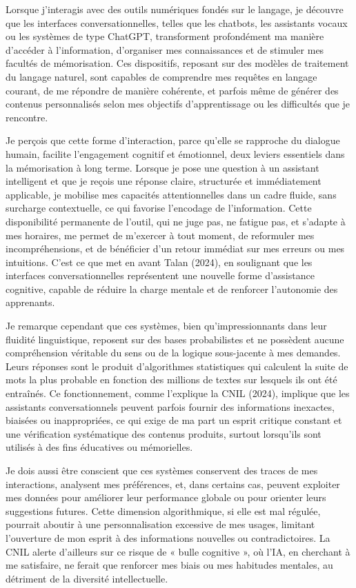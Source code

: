 \documentclass[11pt,a4paper]{report}
\begin{document}
Lorsque j’interagis avec des outils numériques fondés sur le langage, je découvre que les interfaces conversationnelles, telles que les chatbots, les assistants vocaux ou les systèmes de type ChatGPT, transforment profondément ma manière d’accéder à l’information, d’organiser mes connaissances et de stimuler mes facultés de mémorisation. Ces dispositifs, reposant sur des modèles de traitement du langage naturel, sont capables de comprendre mes requêtes en langage courant, de me répondre de manière cohérente, et parfois même de générer des contenus personnalisés selon mes objectifs d’apprentissage ou les difficultés que je rencontre.

Je perçois que cette forme d’interaction, parce qu’elle se rapproche du dialogue humain, facilite l’engagement cognitif et émotionnel, deux leviers essentiels dans la mémorisation à long terme. Lorsque je pose une question à un assistant intelligent et que je reçois une réponse claire, structurée et immédiatement applicable, je mobilise mes capacités attentionnelles dans un cadre fluide, sans surcharge contextuelle, ce qui favorise l’encodage de l’information. Cette disponibilité permanente de l’outil, qui ne juge pas, ne fatigue pas, et s’adapte à mes horaires, me permet de m’exercer à tout moment, de reformuler mes incompréhensions, et de bénéficier d’un retour immédiat sur mes erreurs ou mes intuitions. C’est ce que met en avant Talan (2024), en soulignant que les interfaces conversationnelles représentent une nouvelle forme d’assistance cognitive, capable de réduire la charge mentale et de renforcer l’autonomie des apprenants.

Je remarque cependant que ces systèmes, bien qu’impressionnants dans leur fluidité linguistique, reposent sur des bases probabilistes et ne possèdent aucune compréhension véritable du sens ou de la logique sous-jacente à mes demandes. Leurs réponses sont le produit d’algorithmes statistiques qui calculent la suite de mots la plus probable en fonction des millions de textes sur lesquels ils ont été entraînés. Ce fonctionnement, comme l’explique la CNIL (2024), implique que les assistants conversationnels peuvent parfois fournir des informations inexactes, biaisées ou inappropriées, ce qui exige de ma part un esprit critique constant et une vérification systématique des contenus produits, surtout lorsqu’ils sont utilisés à des fins éducatives ou mémorielles.

Je dois aussi être conscient que ces systèmes conservent des traces de mes interactions, analysent mes préférences, et, dans certains cas, peuvent exploiter mes données pour améliorer leur performance globale ou pour orienter leurs suggestions futures. Cette dimension algorithmique, si elle est mal régulée, pourrait aboutir à une personnalisation excessive de mes usages, limitant l’ouverture de mon esprit à des informations nouvelles ou contradictoires. La CNIL alerte d’ailleurs sur ce risque de « bulle cognitive », où l’IA, en cherchant à me satisfaire, ne ferait que renforcer mes biais ou mes habitudes mentales, au détriment de la diversité intellectuelle.
\end{document}
